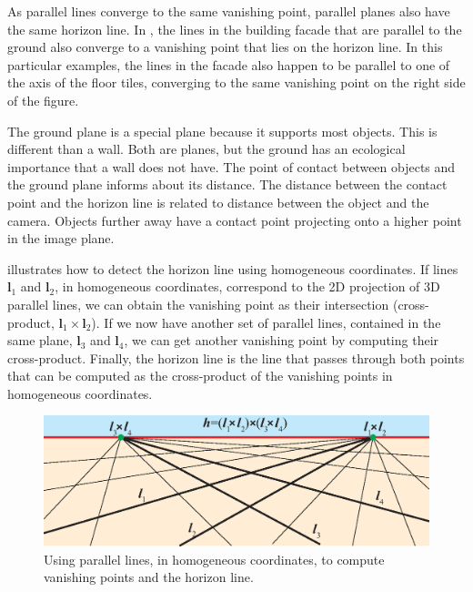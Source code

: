 As parallel lines converge to the same vanishing point, parallel planes also have the same horizon line. In \fig{\ref{fig:palma_horizon}}, the lines in the building facade that are parallel to the ground also converge to a vanishing point that lies on the horizon line. In this particular examples, the lines in the facade also happen to be parallel to one of the axis of the floor tiles, converging to the same vanishing point on the right side of the figure.


The ground plane is a special plane because it supports most objects. This is different than a wall. Both are planes, but the ground has an ecological importance that a wall does not have. The point of contact between objects and the ground plane informs about its distance. The distance between the contact point and the horizon line is related to distance between the object and the camera. Objects further away have a contact point projecting onto a higher point in the image plane. 



\Fig{\ref{fig:horizon_line_cross_products}} illustrates how to detect the horizon line using homogeneous coordinates.
If lines $\boldsymbol{l}_1$ and $\boldsymbol{l}_2$, in homogeneous coordinates, correspond to the 2D projection of 3D parallel lines, we can obtain the vanishing point as their intersection (cross-product, $\boldsymbol{l}_1 \times \boldsymbol{l}_2$). If we now have another set of parallel lines, contained in the same plane, $\boldsymbol{l}_3$ and $\boldsymbol{l}_4$, we can get another vanishing point by computing their cross-product. Finally, the horizon line is the line that passes through both points that can be computed as the cross-product of the vanishing points in homogeneous coordinates. 


\begin{figure}
\centerline{
\includegraphics[width=.9\linewidth]{figures/imaging_geometry/horizon_line.eps}
}
\caption{Using parallel lines, in homogeneous coordinates, to compute vanishing points and the horizon line.}
\label{fig:horizon_line_cross_products}
\end{figure}

